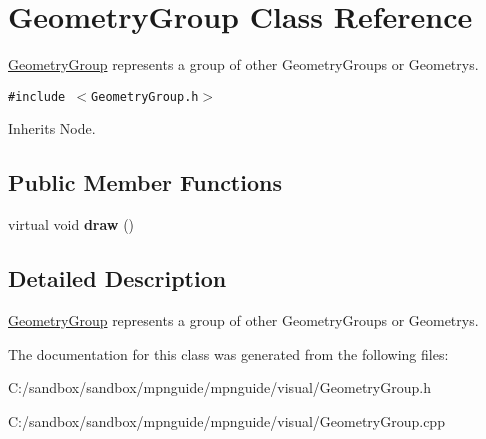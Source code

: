 \hypertarget{class_geometry_group}{
\section{GeometryGroup Class Reference}
\label{class_geometry_group}
}
\hyperlink{class_geometry_group}{GeometryGroup} represents a group of other GeometryGroups or Geometrys.  


{\tt \#include $<$GeometryGroup.h$>$}

Inherits Node.

\subsection*{Public Member Functions}
\begin{CompactItemize}
\item 
\hypertarget{class_geometry_group_56c5cf8a568cff737ff95520cbe6b405}{
virtual void \textbf{draw} ()}
\label{class_geometry_group_56c5cf8a568cff737ff95520cbe6b405}

\end{CompactItemize}


\subsection{Detailed Description}
\hyperlink{class_geometry_group}{GeometryGroup} represents a group of other GeometryGroups or Geometrys. 



The documentation for this class was generated from the following files:\begin{CompactItemize}
\item 
C:/sandbox/sandbox/mpnguide/mpnguide/visual/GeometryGroup.h\item 
C:/sandbox/sandbox/mpnguide/mpnguide/visual/GeometryGroup.cpp\end{CompactItemize}
